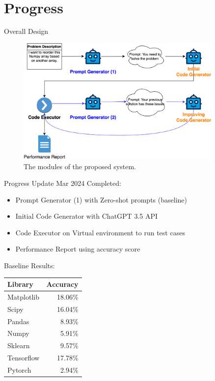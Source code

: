 \section{Progress}

\begin{frame}{Overall Design}
    \begin{figure}[!htb]
        \centering
        \includegraphics[width=0.9\textwidth]{img/selfdebug_design}
        \captionsetup{font=small,labelformat=empty}
        \caption{The modules of the proposed system.}
    \end{figure}
\end{frame}

\begin{frame}{Progress Update  Mar 2024}
    Completed:
    \begin{itemize}
        \item Prompt Generator (1) with Zero-shot prompts (baseline)
        \item Initial Code Generator with ChatGPT 3.5 API
        \item Code Executor on Virtual environment to run test cases
        \item Performance Report using accuracy score
    \end{itemize}

    Baseline Results:
    \begin{tabular}{lr}
        Library    & Accuracy \\
        \hline
        Matplotlib & 18.06\%  \\
        Scipy      & 16.04\%  \\
        Pandas     & 8.93\%   \\
        Numpy      & 5.91\%   \\
        Sklearn    & 9.57\%   \\
        Tensorflow & 17.78\%  \\
        Pytorch    & 2.94\%   \\
    \end{tabular}
\end{frame}

